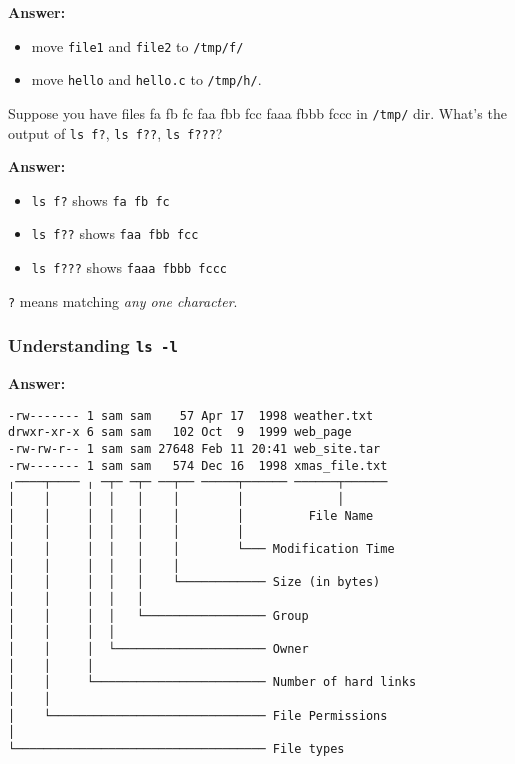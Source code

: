 \documentclass{swfucoursework}
\begin{document}
\textbf{Answer:}

\begin{itemize}
\tightlist
\item
  move \texttt{file1} and \texttt{file2} to
  \texttt{/tmp/f/}
\item
  move \texttt{hello} and \texttt{hello.c} to
  \texttt{/tmp/h/}.
\end{itemize}

Suppose you have files fa fb fc faa fbb fcc faaa fbbb fccc in
\texttt{/tmp/} dir. What's the output of
\texttt{ls f?}, \texttt{ls f??},
\texttt{ls f???}?

\textbf{Answer:}

\begin{itemize}
\tightlist
\item
  \texttt{ls f?} shows \texttt{fa fb fc}
\item
  \texttt{ls f??} shows \texttt{faa fbb fcc}
\item
  \texttt{ls f???} shows \texttt{faaa fbbb fccc}
\end{itemize}

\texttt{?} means matching \emph{any one character}.

\subsubsection{\texorpdfstring{Understanding
\texttt{ls -l}}{Understanding }}\label{understanding-ls--l}

\textbf{Answer:}

\begin{verbatim}
-rw------- 1 sam sam    57 Apr 17  1998 weather.txt
drwxr-xr-x 6 sam sam   102 Oct  9  1999 web_page
-rw-rw-r-- 1 sam sam 27648 Feb 11 20:41 web_site.tar
-rw------- 1 sam sam   574 Dec 16  1998 xmas_file.txt
╷────┬──── ╷ ─┬─ ─┬─ ──┬── ─────┬────── ──────┬──────
│    │     │  │   │    │        │             │
│    │     │  │   │    │        │         File Name
│    │     │  │   │    │        │
│    │     │  │   │    │        └─── Modification Time
│    │     │  │   │    │
│    │     │  │   │    └──────────── Size (in bytes)
│    │     │  │   │
│    │     │  │   └───────────────── Group
│    │     │  │
│    │     │  └───────────────────── Owner
│    │     │
│    │     └──────────────────────── Number of hard links
│    │
│    └────────────────────────────── File Permissions
│
└─────────────────────────────────── File types
\end{verbatim}
\end{document}
